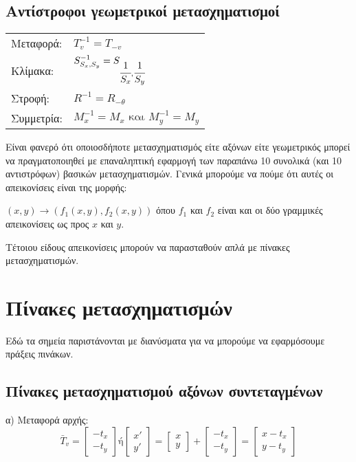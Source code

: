 \subsection{Αντίστροφοι γεωμετρικοί μετασχηματισμοί}


\begin{tabular}{m{}m{}}
	Μεταφορά: & \( T_v^{-1} = T_{-v} \)\\
	Κλίμακα:& \( S_{S_x,S_y}^{-1} = S_{\cfrac{1}{S_x},\cfrac{1}{S_y}} \)\\
	Στροφή:& \( R^{-1} = R_{-\theta} \)  \\
	Συμμετρία:& \( M_x^{-1} = M_x \text{ και } M_y^{-1} = M_y \)
\end{tabular}

Είναι φανερό ότι οποιοσδήποτε μετασχηματισμός είτε αξόνων είτε γεωμετρικός μπορεί να πραγματοποιηθεί με επαναληπτική εφαρμογή των παραπάνω 10 συνολικά (και 10 αντιστρόφων) βασικών μετασχηματισμών. Γενικά μπορούμε να πούμε ότι αυτές οι απεικονίσεις είναι της μορφής:

$(x,y) \to (f_1(x,y),f_2(x,y))$ όπου $f_1$ και $f_2$ είναι και οι δύο γραμμικές απεικονίσεις ως προς $x$ και $y$.


 Τέτοιου είδους απεικονίσεις μπορούν να παρασταθούν απλά με πίνακες μετασχηματισμών.

\section{Πίνακες μετασχηματισμών}

 Εδώ τα σημεία παριστάνονται με διανύσματα για να μπορούμε να εφαρμόσουμε πράξεις πινάκων.

\subsection{Πίνακες μετασχηματισμού αξόνων συντεταγμένων}

 α) Μεταφορά αρχής:
\[
\bar{T}_v =\begin{bmatrix}
-t_x \\-t_y
\end{bmatrix}
\text{ή}
\begin{bmatrix}
x' \\y'
\end{bmatrix}
=
\begin{bmatrix}
x \\y
\end{bmatrix}
+
\begin{bmatrix}
-t_x \\-t_y
\end{bmatrix}
=
\begin{bmatrix}
x - t_x \\y - t_y
\end{bmatrix}
\]

